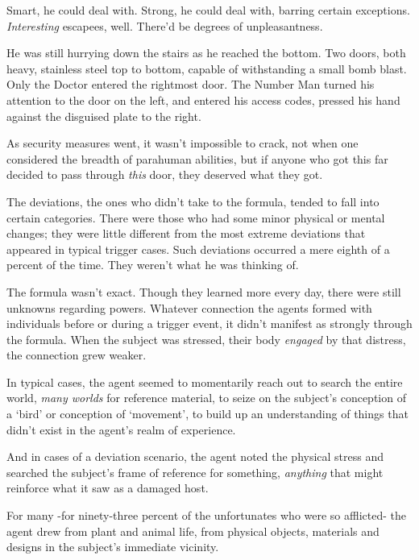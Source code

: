 Smart, he could deal with.  Strong, he could deal with, barring certain exceptions.  \emph{Interesting} escapees, well.  There'd be degrees of unpleasantness.



He was still hurrying down the stairs as he reached the bottom.  Two doors, both heavy, stainless steel top to bottom, capable of withstanding a small bomb blast.  Only the Doctor entered the rightmost door.  The Number Man turned his attention to the door on the left, and entered his access codes, pressed his hand against the disguised plate to the right.



As security measures went, it wasn't impossible to crack, not when one considered the breadth of parahuman abilities, but if anyone who got this far decided to pass through \emph{this} door, they deserved what they got.



The deviations, the ones who didn't take to the formula, tended to fall into certain categories.  There were those who had some minor physical or mental changes; they were little different from the most extreme deviations that appeared in typical trigger cases.  Such deviations occurred a mere eighth of a percent of the time.  They weren't what he was thinking of.



The formula wasn't exact.  Though they learned more every day, there were still unknowns regarding powers.  Whatever connection the agents formed with individuals before or during a trigger event, it didn't manifest as strongly through the formula.  When the subject was stressed, their body \emph{engaged} by that distress, the connection grew weaker.



In typical cases, the agent seemed to momentarily reach out to search the entire world, \emph{many worlds} for reference material, to seize on the subject's conception of a `bird' or conception of `movement', to build up an understanding of things that didn't exist in the agent's realm of experience.



And in cases of a deviation scenario, the agent noted the physical stress and searched the subject's frame of reference for something, \emph{anything} that might reinforce what it saw as a damaged host.



For many -for ninety-three percent of the unfortunates who were so afflicted- the agent drew from plant and animal life, from physical objects, materials and designs in the subject's immediate vicinity.



